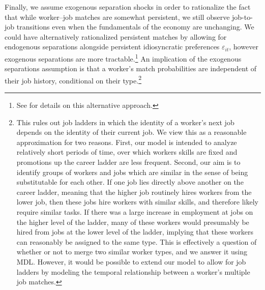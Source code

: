 \documentclass[12pt]{article}
\theoremstyle{definition}
\theoremstyle{plain}
\def\ve{\varepsilon}
\begin{document}
Finally, we assume exogenous separation shocks in order to rationalize the fact that while worker--job matches are somewhat persistent, we still observe job-to-job transitions even when the fundamentals of the economy are unchanging. We could have alternatively rationalized persistent matches by allowing for endogenous separations alongside persistent idiosyncratic preferences $\ve_{it}$, however exogenous separations are more tractable.\footnote{See \citet[ Appendix D]{Grigsby2022} for details on this alternative approach.} An implication of the exogenous separations assumption is that a worker's match probabilities are independent of their job history, conditional on their type.\footnote{This rules out job ladders in which the identity of a worker's next job depends on the identity of their current job. We view this as a reasonable approximation for two reasons. First, our model is intended to analyze relatively short periods of time, over which workers skills are fixed and promotions up the career ladder are less frequent. Second, our aim is to identify groups of workers and jobs which are similar in the sense of being substitutable for each other. If one job lies directly above another on the career ladder, meaning that the higher job routinely hires workers from the lower job, then these jobs hire workers with similar skills, and therefore likely require similar tasks. If there was a large increase in employment at jobs on the higher level of the ladder, many of these workers would presumably be hired from jobs at the lower level of the ladder, implying that these workers can reasonably be assigned to the same type. This is effectively a question of whether or not to merge two similar worker types, and we answer it using MDL.  However, it would be possible to extend our model to allow for job ladders by modeling the temporal relationship between a worker's multiple job matches.} %
\end{document}
